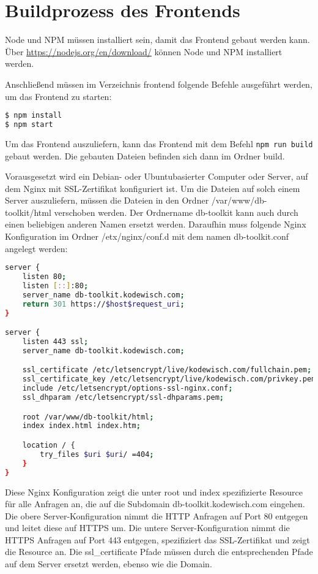 \section{Buildprozess des Frontends}
\label{sec:build_frontend}

Node und NPM müssen installiert sein, damit das Frontend gebaut werden kann.
Über \url{https://nodejs.org/en/download/} können Node und NPM installiert werden.

Anschließend müssen im Verzeichnis frontend folgende Befehle ausgeführt werden, um das Frontend zu starten:

\begin{lstlisting}[language=bash, caption={Frontend build commands},label={lst:fe_build_commands}]
$ npm install
$ npm start
\end{lstlisting}    

Um das Frontend auszuliefern, kann das Frontend mit dem Befehl \lstinline{npm run build} gebaut werden.
Die gebauten Dateien befinden sich dann im Ordner build.

Vorausgesetzt wird ein Debian- oder Ubuntubasierter Computer oder Server, auf dem Nginx mit SSL-Zertifikat konfiguriert ist.
Um die Dateien auf solch einem Server auszuliefern, müssen die Dateien in den Ordner /var/www/db-toolkit/html verschoben werden.
Der Ordnername db-toolkit kann auch durch einen beliebigen anderen Namen ersetzt werden.
Daraufhin muss folgende Nginx Konfiguration im Ordner /etx/nginx/conf.d mit dem namen db-toolkit.conf angelegt werden:

\begin{lstlisting}[language=bash, caption={db-toolkit.conf},label={lst:db-toolkit.conf}]
server { 
    listen 80; 
    listen [::]:80; 
    server_name db-toolkit.kodewisch.com; 
    return 301 https://$host$request_uri; 
} 

server { 
    listen 443 ssl; 
    server_name db-toolkit.kodewisch.com;

    ssl_certificate /etc/letsencrypt/live/kodewisch.com/fullchain.pem; 
    ssl_certificate_key /etc/letsencrypt/live/kodewisch.com/privkey.pem; 
    include /etc/letsencrypt/options-ssl-nginx.conf; 
    ssl_dhparam /etc/letsencrypt/ssl-dhparams.pem; 

    root /var/www/db-toolkit/html;
    index index.html index.htm;

    location / { 
        try_files $uri $uri/ =404; 
    } 
}
\end{lstlisting}    

Diese Nginx Konfiguration zeigt die unter root und index spezifizierte Resource für alle Anfragen an, die auf die Subdomain db-toolkit.kodewisch.com eingehen.
Die obere Server-Konfiguration nimmt die HTTP Anfragen auf Port 80 entgegen und leitet diese auf HTTPS um.
Die untere Server-Konfiguration nimmt die HTTPS Anfragen auf Port 443 entgegen, spezifiziert das SSL-Zertifikat und zeigt die Resource an.
Die ssl\_certificate Pfade müssen durch die entsprechenden Pfade auf dem Server ersetzt werden, ebenso wie die Domain.
